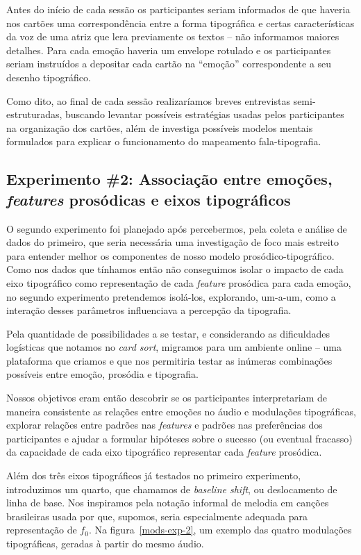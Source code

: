 \documentclass[a4paper]{tufte-handout}
\newcommand{\textls}[2][5]{%
    \begingroup\addfontfeatures{LetterSpace=#1}#2\endgroup
  }
\renewcommand{\smallcapsspacing}[1]{\textls[10]{#1}}
\renewcommand{\textsc}[1]{\smallcapsspacing{\textsmallcaps{#1}}}
\newcommand{\num}[1]{\textsc{(\oldstylenums{#1})}}
\begin{document}
Antes do início de cada sessão os participantes seriam informados de que haveria nos cartões uma correspondência entre a forma tipográfica e certas características da voz de uma atriz que lera previamente os textos -- não informamos maiores detalhes. Para cada emoção haveria um envelope rotulado e os participantes seriam instruídos a depositar cada cartão na ``emoção'' correspondente a seu desenho tipográfico. 

Como dito, ao final de cada sessão realizaríamos breves entrevistas semi-estruturadas, buscando levantar possíveis estratégias usadas pelos participantes na organização dos cartões, além de investiga possíveis modelos mentais formulados para explicar o funcionamento do mapeamento fala-tipografia.

\subsection{Experimento \#2: Associação entre emoções, \textit{features} prosódicas e eixos tipográficos}\label{sec:met_exp_2}

O segundo experimento foi planejado após percebermos, pela coleta e análise de dados do primeiro, que seria necessária uma investigação de foco mais estreito para entender melhor os componentes de nosso modelo prosódico-tipográfico. Como nos dados que tínhamos então não conseguimos isolar o impacto de cada eixo tipográfico como representação de cada \textit{feature} prosódica para cada emoção, no segundo experimento pretendemos isolá-los, explorando, um-a-um, como a interação desses parâmetros influenciava a percepção da tipografia. 

Pela quantidade de possibilidades a se testar, e considerando as dificuldades logísticas que notamos no \textit{card sort}, migramos para um ambiente online -- uma plataforma que criamos e que nos permitiria testar as inúmeras combinações possíveis entre emoção, prosódia e tipografia. 

Nossos objetivos eram então \num{1} descobrir se os participantes interpretariam de maneira consistente as relações entre emoções no áudio e modulações tipográficas, \num{2} explorar relações entre padrões nas \textit{features} e padrões nas preferências dos participantes e \num{3} ajudar a formular hipóteses sobre o sucesso (ou eventual fracasso) da capacidade de cada eixo tipográfico representar cada \textit{feature} prosódica.

Além dos três eixos tipográficos já testados no primeiro experimento, introduzimos um quarto, que chamamos de \textit{baseline shift}, ou deslocamento de linha de base. Nos inspiramos pela notação informal de melodia em canções brasileiras usada por \citet{tatit} que, supomos, seria especialmente adequada para representação de $f_0$. Na figura~\ref{mods-exp-2}, um exemplo das quatro modulações tipográficas, geradas à partir do mesmo áudio.
\end{document}

